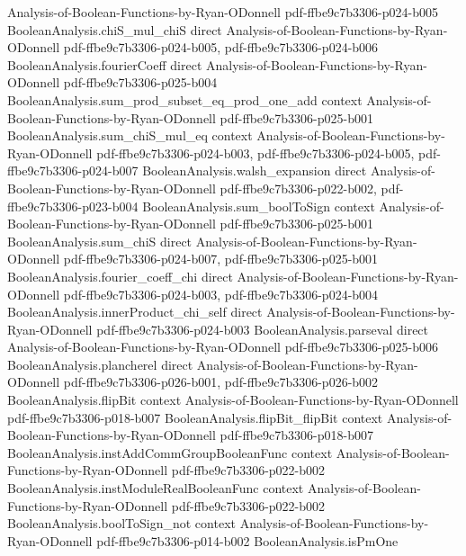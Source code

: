 \begin{theorem}
  {Analysis-of-Boolean-Functions-by-Ryan-ODonnell}
  {pdf-ffbe9c7b3306-p024-b005}
\proofstep
  {BooleanAnalysis.chiS_mul_chiS}
  {direct}
  {Analysis-of-Boolean-Functions-by-Ryan-ODonnell}
  {pdf-ffbe9c7b3306-p024-b005,
    pdf-ffbe9c7b3306-p024-b006}
\proofstep
  {BooleanAnalysis.fourierCoeff}
  {direct}
  {Analysis-of-Boolean-Functions-by-Ryan-ODonnell}
  {pdf-ffbe9c7b3306-p025-b004}
\proofstep
  {BooleanAnalysis.sum_prod_subset_eq_prod_one_add}
  {context}
  {Analysis-of-Boolean-Functions-by-Ryan-ODonnell}
  {pdf-ffbe9c7b3306-p025-b001}
\proofstep
  {BooleanAnalysis.sum_chiS_mul_eq}
  {context}
  {Analysis-of-Boolean-Functions-by-Ryan-ODonnell}
  {pdf-ffbe9c7b3306-p024-b003,
    pdf-ffbe9c7b3306-p024-b005,
    pdf-ffbe9c7b3306-p024-b007}
\proofstep
  {BooleanAnalysis.walsh_expansion}
  {direct}
  {Analysis-of-Boolean-Functions-by-Ryan-ODonnell}
  {pdf-ffbe9c7b3306-p022-b002,
    pdf-ffbe9c7b3306-p023-b004}
\proofstep
  {BooleanAnalysis.sum_boolToSign}
  {context}
  {Analysis-of-Boolean-Functions-by-Ryan-ODonnell}
  {pdf-ffbe9c7b3306-p025-b001}
\proofstep
  {BooleanAnalysis.sum_chiS}
  {direct}
  {Analysis-of-Boolean-Functions-by-Ryan-ODonnell}
  {pdf-ffbe9c7b3306-p024-b007,
    pdf-ffbe9c7b3306-p025-b001}
\proofstep
  {BooleanAnalysis.fourier_coeff_chi}
  {direct}
  {Analysis-of-Boolean-Functions-by-Ryan-ODonnell}
  {pdf-ffbe9c7b3306-p024-b003,
    pdf-ffbe9c7b3306-p024-b004}
\proofstep
  {BooleanAnalysis.innerProduct_chi_self}
  {direct}
  {Analysis-of-Boolean-Functions-by-Ryan-ODonnell}
  {pdf-ffbe9c7b3306-p024-b003}
\proofstep
  {BooleanAnalysis.parseval}
  {direct}
  {Analysis-of-Boolean-Functions-by-Ryan-ODonnell}
  {pdf-ffbe9c7b3306-p025-b006}
\proofstep
  {BooleanAnalysis.plancherel}
  {direct}
  {Analysis-of-Boolean-Functions-by-Ryan-ODonnell}
  {pdf-ffbe9c7b3306-p026-b001,
    pdf-ffbe9c7b3306-p026-b002}
\proofstep
  {BooleanAnalysis.flipBit}
  {context}
  {Analysis-of-Boolean-Functions-by-Ryan-ODonnell}
  {pdf-ffbe9c7b3306-p018-b007}
\proofstep
  {BooleanAnalysis.flipBit_flipBit}
  {context}
  {Analysis-of-Boolean-Functions-by-Ryan-ODonnell}
  {pdf-ffbe9c7b3306-p018-b007}
\proofstep
  {BooleanAnalysis.instAddCommGroupBooleanFunc}
  {context}
  {Analysis-of-Boolean-Functions-by-Ryan-ODonnell}
  {pdf-ffbe9c7b3306-p022-b002}
\proofstep
  {BooleanAnalysis.instModuleRealBooleanFunc}
  {context}
  {Analysis-of-Boolean-Functions-by-Ryan-ODonnell}
  {pdf-ffbe9c7b3306-p022-b002}
\proofstep
  {BooleanAnalysis.boolToSign_not}
  {context}
  {Analysis-of-Boolean-Functions-by-Ryan-ODonnell}
  {pdf-ffbe9c7b3306-p014-b002}
\proofstep
  {BooleanAnalysis.isPmOne}

\end{theorem}
